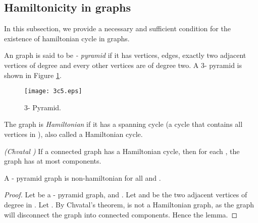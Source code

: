 \documentclass[runningheads]{llncs}
\begin{document}
\subsection{Hamiltonicity in  graphs}

In this subsection, we provide a necessary and sufficient condition for the existence of hamiltonian cycle in  graphs.


\begin{definition}
 An  graph is said to be \emph{- pyramid} if it has  vertices,  edges, exactly two adjacent vertices of degree  and every other vertices are of degree two. A 3- pyramid is shown in Figure  \ref{fig: 3c5}.
\end{definition}

\begin{figure}[h]
\begin{center}
\texttt{[image: 3c5.eps]}
\vspace{-0.5cm}
\caption{3- Pyramid.}
\label{fig: 3c5}
\end{center}
\end{figure}

\begin{definition}
 The graph  is \emph{Hamiltonian} if it has a spanning cycle (a cycle that contains all vertices in ), also called a Hamiltonian cycle.
 \end{definition}
 
\begin{theorem}
\emph{(Chvatal \cite{chvatal})} If a connected graph  has a Hamiltonian cycle, then for each , the graph  has at most  components.
\end{theorem}


 
\begin{lemma}
\label{ncknonhamiltonian}
A - pyramid graph is non-hamiltonian for all  and .
\end{lemma}
\begin{proof}
Let  be a - pyramid graph,  and . Let  and  be the two adjacent vertices of degree  in . Let . By Chvatal's theorem,  is not a Hamiltonian graph, as the graph  will disconnect the graph into  connected components. Hence the lemma.

\end{proof}
\end{document}
